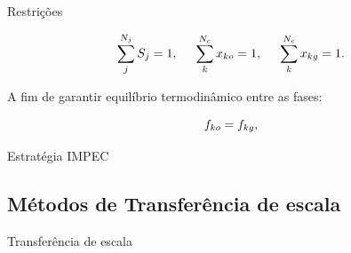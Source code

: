 \documentclass[professionalfont]{beamer}
\begin{document}
\begin{frame}{Restrições}

    \begin{equation}
        \label{eq:modelo_mat.9}
        \sum_{j}^{N_{j}} S_{j} = 1, \hspace{0.5cm} \sum_{k}^{N_{c}} x_{k o} = 1, \hspace{0.5cm} \sum_{k}^{N_{c}} x_{k g} = 1.
    \end{equation}

    A fim de garantir equilíbrio termodinâmico entre as fases:

    \begin{equation}
        \label{eq:modelo_mat.8}
        f_{k o} = f_{k g},
    \end{equation}
    
\end{frame}

    


\begin{frame}{Estratégia IMPEC}
    \centering
        \resizebox*{4cm}{!}{
        }
\end{frame}


    

\subsection{Métodos de Transferência de escala}
\begin{frame}{Transferência de escala}
    \begin{figure}[!ht]
        \begin{subfigure}{0.4\textwidth}
            \centering
            \resizebox*{5cm}{!}{
            }
            \label{fig:multiescala.1.b}
        \end{subfigure}
        \begin{subfigure}{0.55\textwidth}
            \centering
            \resizebox*{6.5cm}{!}{
            }
            \label{fig:multiescala.1.a}
        \end{subfigure}
    \end{figure}
\end{frame}
\end{document}
